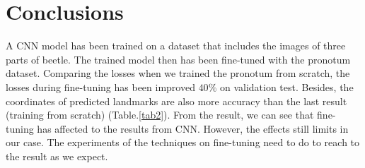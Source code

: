 \documentclass[12pt,a4paper]{article}
\begin{document}
\section{Conclusions}
A CNN model has been trained on a dataset that includes the images of three parts of beetle. The trained model then has been fine-tuned with the pronotum dataset. Comparing the losses when we trained the pronotum from scratch, the losses during fine-tuning has been improved $40\%$ on validation test. Besides, the coordinates of predicted landmarks are also more accuracy than the last result (training from scratch) (Table.\ref{tab2}). From the result, we can see that fine-tuning has affected to the results from CNN. However, the effects still limits in our case. The experiments of the techniques on fine-tuning need to do to reach to the result as we expect.


\end{document}
